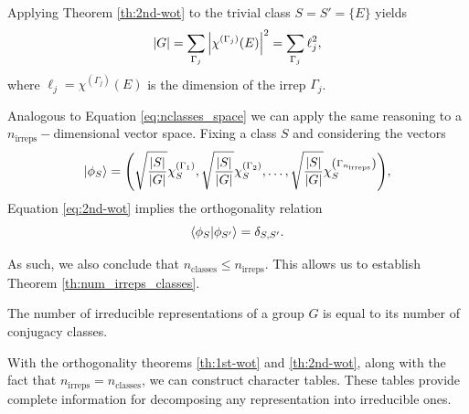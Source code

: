 \begin{corollary} \label{coro:chi_E}
Applying Theorem \ref{th:2nd-wot} to the trivial class $S = S' = \{E\}$ yields
\begin{equation} \label{eq:chi_E_coro}
\abs{G} = \sum_{\Gamma_j} \abs{\chi^{(\Gamma_j)}(E)}^2 = \sum_{\Gamma_j} \ell_j^2,
\end{equation}
where $\ell_j = \chi^{(\Gamma_j)}(E)$ is the dimension of the irrep $\Gamma_j$.
\end{corollary}

Analogous to Equation \ref{eq:nclasses_space} we can apply the same reasoning to a $n_{\text{irreps}}-$dimensional vector space. Fixing a class $S$ and considering the vectors
\begin{equation} \label{eq:nirreps_space}
\ket{\phi_{S}} =
\qty(
\sqrt{\frac{\abs{S}}{\abs{G}}} \chi^{(\Gamma_1)}_{S},
\sqrt{\frac{\abs{S}}{\abs{G}}} \chi^{(\Gamma_2)}_{S},
\ldots,
\sqrt{\frac{\abs{S}}{\abs{G}}} \chi^{\qty(\Gamma_{n_{\text{irreps}}})}_{S}
),
\end{equation}
Equation \ref{eq:2nd-wot} implies the orthogonality relation
\begin{equation} \label{eq:orthog_phis_classes}
\braket{\phi_{S}}{\phi_{S'}} = \delta_{S, S'}.
\end{equation}

As such, we also conclude that $n_{\text{classes}} \leq n_{\text{irreps}}$. This allows us to establish Theorem \ref{th:num_irreps_classes}.

\begin{theorem}[$\bm{n_{\textbf{irreps}} = n_{\textbf{classes}}}$] \label{th:num_irreps_classes}
The number of irreducible representations of a group $G$ is equal to its number of conjugacy classes.
\end{theorem}

With the orthogonality theorems \ref{th:1st-wot} and \ref{th:2nd-wot}, along with the fact that \(n_{\text{irreps}} = n_{\text{classes}}\), we can construct character tables. These tables provide complete information for decomposing any representation into irreducible ones. %

